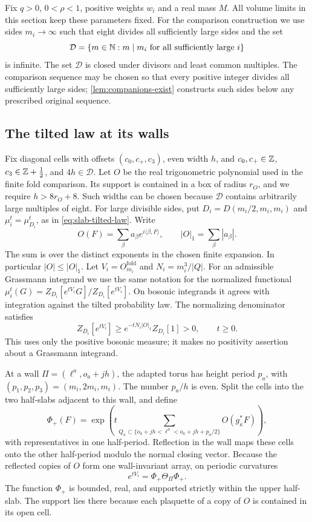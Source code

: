 Fix $q>0$, $0<\rho<1$, positive weights $w_i$ and a real mass $M$.
All volume limits in this section keep these parameters fixed. For the comparison construction we
use sides $m_i\to\infty$ such that eight divides all sufficiently
large sides and the set
\[
 \mathcal D=\{m\in\mathbb N:m\mid m_i\text{ for all sufficiently large }i\}
\]
is infinite. The set $\mathcal D$ is closed under divisors and least
common multiples. The comparison sequence may be chosen so that every positive integer
divides all sufficiently large sides; \cref{lem:companions-exist}
constructs such sides below any prescribed original sequence.

\subsection{The tilted law at its walls}\label{subsec:diag-wall-law}

Fix diagonal cells with offsets $(c_0,c_+,c_3)$, even width $h$, and
$c_0,c_+\in\mathbb Z$, $c_3\in\mathbb Z+\tfrac12$, and $4h\in\mathcal D$.
Let $O$ be the real trigonometric polynomial used in the finite fold
comparison. Its support is contained in a box of radius $r_O$, and
we require $h>8r_O+8$. Such widths can be chosen because
$\mathcal D$ contains arbitrarily large multiples of eight. For
large divisible sides, put $D_i=D(m_i/2,m_i,m_i)$ and
$\mu_i^t=\mu_{D_i}^t$, as in \eqref{eq:slab-tilted-law}. Write
\[
 O(F)=\sum_\beta a_\beta e^{i\langle\beta,F\rangle},
 \qquad |O|_1=\sum_\beta|a_\beta|.
\]
The sum is over the distinct exponents in the chosen finite expansion.
In particular $|O|\le|O|_1$. Let $V_i=O_{m_i}^{\mathrm{fold}}$ and
$N_i=m_i^3/|Q|$. For an admissible Grassmann integrand we use
the same notation for the normalized functional
$\mu_i^t(G)=Z_{D_i}[e^{tV_i}G]/Z_{D_i}[e^{tV_i}]$.
On bosonic integrands it agrees with integration against the
tilted probability law. The normalizing denominator satisfies
\begin{equation}\label{eq:diag-tilt-denominator}
 Z_{D_i}[e^{tV_i}]\ge e^{-tN_i|O|_1}Z_{D_i}[1]>0,
 \qquad t\ge0.
\end{equation}
This uses only the positive bosonic measure; it makes no positivity
assertion about a Grassmann integrand.

At a wall $\Pi=(\ell^a,o_a+jh)$, the adapted torus has height period
$p_a$, with $(p_1,p_2,p_3)=(m_i,2m_i,m_i)$. The number $p_a/h$ is
even. Split the cells into the two half-slabs adjacent to this wall,
and define
\[
 \Phi_+(F)=\exp\left(t\sum_{Q_\kappa\subset
              \{o_a+jh<\ell^a<o_a+jh+p_a/2\}}O(g_\kappa^*F)\right),
\]
with representatives in one half-period. Reflection in the wall
maps these cells onto the other half-period modulo the normal closing
vector. Because the reflected copies of $O$ form one wall-invariant
array, on periodic curvatures
\begin{equation}\label{eq:diag-wall-factorization}
 e^{tV_i}=\Phi_+\Theta_\Pi\Phi_+.
\end{equation}
The function $\Phi_+$ is bounded, real, and supported strictly within
the upper half-slab. The support lies there because each plaquette
of a copy of $O$ is contained in its open cell.

